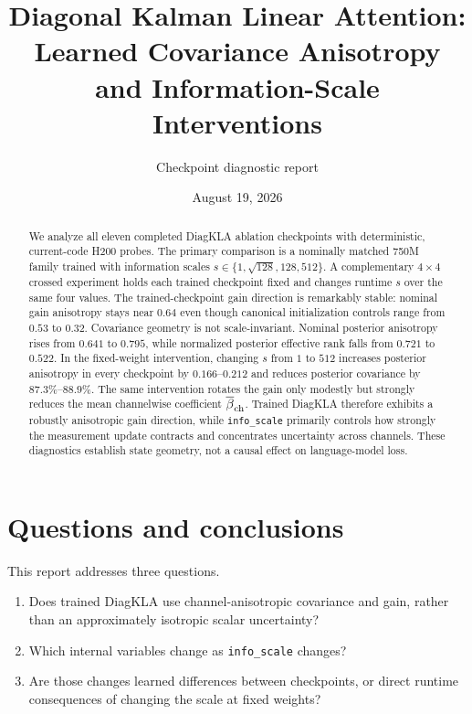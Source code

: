 \documentclass[11pt]{article}
\title{Diagonal Kalman Linear Attention:\\
Learned Covariance Anisotropy and Information-Scale Interventions}
\author{Checkpoint diagnostic report}
\date{August 19, 2026}
\newcommand{\code}[1]{\texttt{#1}}
\begin{document}
\maketitle

\begin{abstract}
We analyze all eleven completed DiagKLA ablation checkpoints with deterministic,
current-code H200 probes.  The primary comparison is a nominally matched 750M family
trained with information scales
$s\in\{1,\sqrt{128},128,512\}$.  A complementary $4\times4$ crossed experiment
holds each trained checkpoint fixed and changes runtime $s$ over the same four values.
The trained-checkpoint gain direction is remarkably stable: nominal gain anisotropy stays
near $0.64$ even though canonical initialization controls range from $0.53$ to $0.32$.
Covariance geometry is not scale-invariant.  Nominal posterior anisotropy rises from
$0.641$ to $0.795$, while normalized posterior effective rank falls from $0.721$ to
$0.522$.  In the fixed-weight intervention, changing $s$ from $1$ to $512$ increases
posterior anisotropy in every checkpoint by $0.166$--$0.212$ and reduces posterior
covariance by $87.3\%$--$88.9\%$.  The same intervention rotates the gain only modestly
but strongly reduces the mean channelwise coefficient $\overline\beta_{\rm ch}$.  Trained
DiagKLA therefore exhibits a robustly anisotropic gain direction, while
\code{info\_scale} primarily controls how strongly
the measurement update contracts and concentrates uncertainty across channels.
These diagnostics establish state geometry, not a causal effect on language-model loss.
\end{abstract}

\tableofcontents

\section{Questions and conclusions}

This report addresses three questions.
\begin{enumerate}
  \item Does trained DiagKLA use channel-anisotropic covariance and gain, rather than an
  approximately isotropic scalar uncertainty?
  \item Which internal variables change as \code{info\_scale} changes?
  \item Are those changes learned differences between checkpoints, or direct runtime
  consequences of changing the scale at fixed weights?
\end{enumerate}
\end{document}
